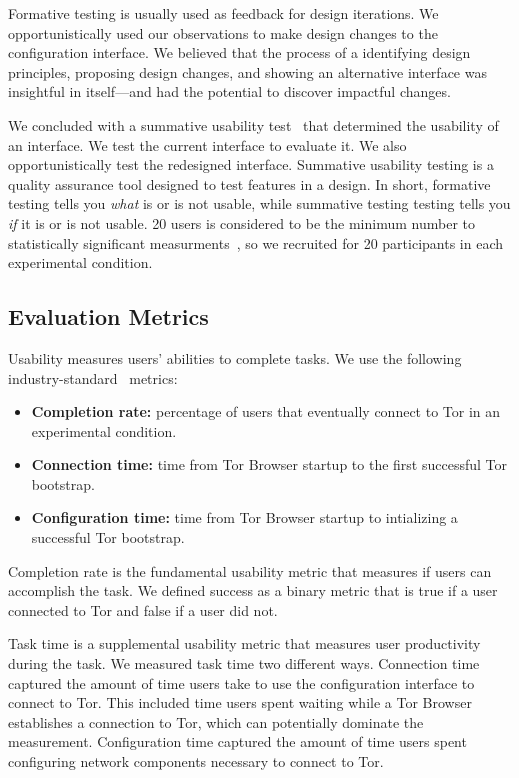 \documentclass[USenglish,oneside,twocolumn]{article}
\begin{document}
Formative testing is usually used as feedback for design iterations. We opportunistically used our observations to make design changes to the configuration interface. We believed that the process of a identifying design principles, proposing design changes, and showing an alternative interface was insightful in itself---and had the potential to discover impactful changes.

We concluded with a summative usability test~\cite{summative} that determined the usability of an interface. We test the current interface to evaluate it. We also opportunistically test the redesigned interface. Summative usability testing is a quality assurance tool designed to test features in a design. In short, formative testing tells you {\it what} is or is not usable, while summative testing testing tells you {\it if} it is or is not usable. 20 users is considered to be the minimum number to statistically significant measurments~\cite{howmanyusers}, so we recruited for 20 participants in each experimental condition.  

\subsection{Evaluation Metrics}
\label{sec:eval}
Usability measures users' abilities to complete tasks. We use the following industry-standard~\cite{albert2013measuring} metrics: \\

\begin{itemize}
\item {\bfseries Completion rate:}  percentage of users that eventually connect to Tor in an experimental condition. 
\item {\bfseries Connection time:} time from Tor Browser startup to the first successful Tor bootstrap. 
\item {\bfseries Configuration time:} time from Tor Browser startup to intializing a successful Tor bootstrap.
\end{itemize}

Completion rate is the fundamental usability metric that measures if users can accomplish the task. We defined success as a binary metric that is true if a user connected to Tor and false if a user did not. 

Task time is a supplemental usability metric that measures user productivity during the task. We measured task time two different ways. Connection time captured the amount of time users take to use the configuration interface to connect to Tor. This included time users spent waiting while a Tor Browser establishes a connection to Tor, which can potentially dominate the measurement. Configuration time captured the amount of time users spent configuring network components necessary to connect to Tor. 
\end{document}
